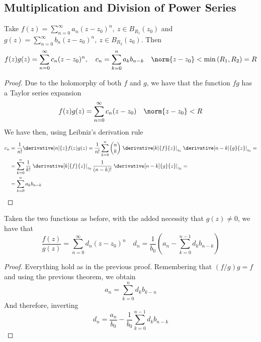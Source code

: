 \documentclass[../mmf.tex]{subfiles}
\begin{document}
\subsection{Multiplication and Division of Power Series}
\begin{thm}
	Take $f(z)=\sum_{n=0}^\infty a_n(z-z_0)^n,\ z\in B_{R_1}(z_0)$ and $g(z)=\sum_{n=0}^\infty b_n(z-z_0)^n,\ z\in B_{R_2}(z_0)$. Then
	\begin{equation*}
		f(z)g(z)=\sum_{n=0}^\infty c_n(z-z_0)^n,\quad c_n=\sum_{k=0}^na_kb_{n-k}\quad \norm{z-z_0}<\min\left( R_1,R_2 \right)=R
	\end{equation*}
\end{thm}
\begin{proof}
	Due to the holomorphy of both $f$ and $g$, we have that the function $fg$ has a Taylor series expansion
	\begin{equation*}
		f(z)g(z)=\sum_{n=0}^\infty c_n(z-z_0)\quad\norm{z-z_0}<R
	\end{equation*}
	We have then, using Leibniz's derivation rule
	\begin{equation*}
		\begin{aligned}
			c_n&=\frac{1}{n!}\derivative[n]{z}f(z)g(z)=\frac{1}{n!}\sum_{k=0}^{n}\begin{pmatrix}n\\k\end{pmatrix}\left.\derivative[k]{f}{z}\right|_{z_0}\left.\derivative[n-k]{g}{z}\right|_{z_0}=\\
			&=\sum_{k=0}^{n}\frac{1}{k!}\left.\derivative[k]{f}{z}\right|_{z_0}\frac{1}{(n-k)!}\left.\derivative[n-k]{g}{z}\right|_{z_0}=\\
			&=\sum_{k=0}^na_kb_{n-k}
		\end{aligned}
	\end{equation*}
\end{proof}
\begin{thm}
	Taken the two functions as before, with the added necessity that $g(z)\ne0$, we have that
	\begin{equation*}
		\frac{f(z)}{g(z)}=\sum_{n=0}^{\infty}d_n(z-z_0)^n\quad d_n=\frac{1}{b_0}\left( a_n-\sum_{k=0}^{n-1}d_kb_{n-k} \right)
	\end{equation*}
\end{thm}
\begin{proof}
	Everything hold as in the previous proof. Remembering that $(f/g)g=f$ and using the previous theorem, we obtain
	\begin{equation*}
		a_n=\sum_{k=0}^{n}d_kb_{k-n}
	\end{equation*}
	And therefore, inverting
	\begin{equation*}
		d_n=\frac{a_n}{b_0}-\frac{1}{b_0}\sum_{k=0}^{n-1}d_kb_{n-k}
	\end{equation*}
\end{proof}
\end{document}
